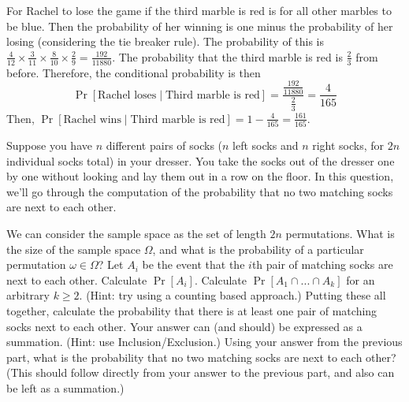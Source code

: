 \documentclass[11pt]{article}
\begin{document}
\begin{solution}
\begin{Parts}
\Part For Rachel to lose the game if the third marble is red is for all other
marbles to be blue. Then the probability of her winning is one minus the probability
of her losing (considering the tie breaker rule). The probability of this is $\frac{4}{12} 
\times \frac{3}{11} \times \frac{8}{10} \times \frac{2}{9} = \frac{192}{11880}$. 
The probability that the third marble is red is $\frac{2}{3}$ from before. 
Therefore, the conditional probability is then
\[
    \Pr[\text{Rachel loses} \mid \text{Third marble is red}] = \frac{\frac{192}{11880}}
    {\frac{2}{3}} = \frac{4}{165}
\]
Then, $\Pr[\text{Rachel wins} \mid \text{Third marble is red}] = 1 - \frac{4}{165} = 
\frac{161}{165}$.

\end{Parts}

\end{solution}

Suppose you have $n$ different pairs of socks ($n$ left socks and $n$ right 
socks, for $2n$ individual socks total) in your dresser. You take the socks out 
of the dresser one by one without looking and lay them out in a row on the floor. 
In this question, we'll go through the computation of the probability that no 
two matching socks are next to each other.

\begin{Parts}
    \Part We can consider the sample space as the set of length $2n$ permutations. 
    What is the size of the sample space $\Omega$, and what is the probability 
    of a particular permutation $\omega \in \Omega$?
    \Part Let $A_i$ be the event that the $i$th pair of matching socks are next 
    to each other. Calculate $\Pr[A_i]$.
    \Part Calculate $\Pr[A_1 \cap  ... \cap A_k]$ for an arbitrary $k \geq 2$. 
    (Hint: try using a counting based approach.)
    \Part Putting these all together, calculate the probability that there is 
    at least one pair of matching socks next to each other. Your answer can (and 
    should) be expressed as a summation. (Hint: use Inclusion/Exclusion.)
    \Part Using your answer from the previous part, what is the probability that 
    no two matching socks are next to each other? (This should follow directly 
    from your answer to the previous part, and also can be left as a summation.)
\end{Parts}
\end{document}
